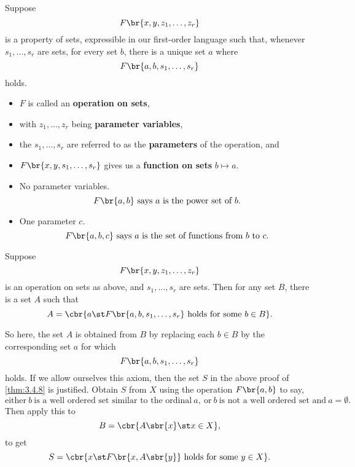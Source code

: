 \begin{definition}
\label{def:3.4.9}
Suppose
$$ F\br{x, y, z_1, \dots, z_r} $$
is a property of sets, expressible in our first-order language such that, whenever $ s_1, \dots, s_r $ are sets, for every set $ b $, there is a unique set $ a $ where
$$ F\br{a, b, s_1, \dots, s_r} $$
holds.
\begin{itemize}
\item $ F $ is called an \textbf{operation on sets},
\item with $ z_1, \dots, z_r $ being \textbf{parameter variables},
\item the $ s_1, \dots, s_r $ are referred to as the \textbf{parameters} of the operation, and
\item $ F\br{x, y, s_1, \dots, s_r} $ gives us a \textbf{function on sets} $ b \mapsto a $.
\end{itemize}
\end{definition}

\pagebreak

\begin{example*}
\hfill
\begin{itemize}
\item No parameter variables.
$$ F\br{a, b} \ \text{says} \ a \ \text{is the power set of} \ b. $$
\item One parameter $ c $.
$$ F\br{a, b, c} \ \text{says} \ a \ \text{is the set of functions from} \ b \ \text{to} \ c. $$
\end{itemize}
\end{example*}

\begin{axiom**}
Suppose
$$ F\br{x, y, z_1, \dots, z_r} $$
is an operation on sets as above, and $ s_1, \dots, s_r $ are sets. Then for any set $ B $, there is a set $ A $ such that
$$ A = \cbr{a \st F\br{a, b, s_1, \dots, s_r} \ \text{holds for some} \ b \in B}. $$
\end{axiom**}

So here, the set $ A $ is obtained from $ B $ by replacing each $ b \in B $ by the corresponding set $ a $ for which
$$ F\br{a, b, s_1, \dots, s_r} $$
holds. If we allow ourselves this axiom, then the set $ S $ in the above proof of \ref{thm:3.4.8} is justified. Obtain $ S $ from $ X $ using the operation $ F\br{a, b} $ to say,
$$ \text{either} \ b \ \text{is a well ordered set similar to the ordinal} \ a, \ \text{or} \ b \ \text{is not a well ordered set and} \ a = \emptyset. $$
Then apply this to
$$ B = \cbr{A\sbr{x} \st x \in X}, $$
to get
$$ S = \cbr{x \st F\br{x, A\sbr{y}} \ \text{holds for some} \ y \in X}. $$

